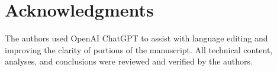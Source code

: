 \documentclass[10pt,letterpaper]{article}
\begin{document}







\section*{Acknowledgments}
The authors used OpenAI ChatGPT to assist with language editing and improving the clarity of portions of the manuscript. All technical content, analyses, and conclusions were reviewed and verified by the authors.

\FloatBarrier


\end{document}
